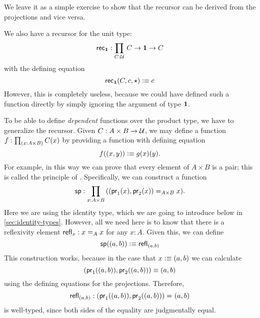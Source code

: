 We leave it as a simple exercise to show that the recursor can be
derived from the projections and vice versa.

We also have a recursor for the unit type:
\[\rec{\unit} : \prd{C:\UU}C \to \unit \to C\]
with the defining equation
\[ \rec{\unit}(C,c,\ttt) \defeq c \]
However, this is completely useless,
because we could have defined such a function directly
by simply ignoring the argument of type $\unit$.

To be able to define \emph{dependent} functions over the product type, we have
to generalize the recursor. Given $C: A \times B \to \UU$, we may
define a function $f : \prd{x : A \times B} C(x)$ by providing a
function
with defining equation
\[ f(\tup x y) \defeq g(x)(y). \] 
For example, in this way we can prove that every element of $A\times B$ is a pair; this is called the principle of .
%
Specifically, we can construct a function
\[ \spr : \prd{x:A \times B} (\id[A\times B]{\tup{\fst {(x)}}{\snd {(x)}}}{x}). \]
Here we are using the identity type, which we are going to introduce below in \autoref{sec:identity-types}.
However, all we need here is to know that there is a reflexivity element $\refl{x} : \id[A]{x}{x}$ for any $x:A$.
Given this, we can define
\[ \spr(\tup{a}{b}) \defeq \refl{\tup{a}{b}} \]
This construction works, because in the case that $x \defeq \tup{a}{b}$ we can 
calculate 
\[ \tup{\fst(\tup{a}{b})}{\snd{(\tup{a}{b})}} \jdeq \tup{a}{b} \]
using the defining equations for the projections. Therefore,
\[ \refl{\tup{a}{b}} : \id{\tup{\fst(\tup{a}{b})}{\snd{(\tup{a}{b})}}}{\tup{a}{b}} \]
is well-typed, since both sides of the equality are judgmentally equal.

